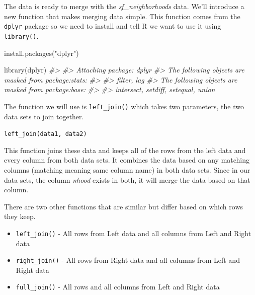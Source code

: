 \documentclass[
  12pt,
  openany]{book}
\newenvironment{Shaded}{\begin{snugshade}}{\end{snugshade}}
\newcommand{\CommentTok}[1]{\textcolor[rgb]{0.37,0.37,0.37}{\textit{#1}}}
\newcommand{\FunctionTok}[1]{\textcolor[rgb]{0,0,0}{#1}}
\newcommand{\NormalTok}[1]{#1}
\newcommand{\StringTok}[1]{\textcolor[rgb]{0.5,0.5,0.5}{#1}}
\providecommand{\tightlist}{%
  \setlength{\itemsep}{0pt}\setlength{\parskip}{0pt}}
\begin{document}
The data is ready to merge with the \emph{sf\_neighborhoods} data. We'll introduce a new function that makes merging data simple. This function comes from the \texttt{dplyr} package so we need to install and tell R we want to use it using \texttt{library()}.

\begin{Shaded}
\begin{Highlighting}[]
\FunctionTok{install.packages}\NormalTok{(}\StringTok{"dplyr"}\NormalTok{)}
\end{Highlighting}
\end{Shaded}

\begin{Shaded}
\begin{Highlighting}[]
\FunctionTok{library}\NormalTok{(dplyr)}
\CommentTok{\#\textgreater{} }
\CommentTok{\#\textgreater{} Attaching package: \textquotesingle{}dplyr\textquotesingle{}}
\CommentTok{\#\textgreater{} The following objects are masked from \textquotesingle{}package:stats\textquotesingle{}:}
\CommentTok{\#\textgreater{} }
\CommentTok{\#\textgreater{}     filter, lag}
\CommentTok{\#\textgreater{} The following objects are masked from \textquotesingle{}package:base\textquotesingle{}:}
\CommentTok{\#\textgreater{} }
\CommentTok{\#\textgreater{}     intersect, setdiff, setequal, union}
\end{Highlighting}
\end{Shaded}

The function we will use is \texttt{left\_join()} which takes two parameters, the two data sets to join together.

\texttt{left\_join(data1,\ data2)}

This function joins these data and keeps all of the rows from the left data and every column from both data sets. It combines the data based on any matching columns (matching meaning same column name) in both data sets. Since in our data sets, the column \emph{nhood} exists in both, it will merge the data based on that column.

There are two other functions that are similar but differ based on which rows they keep.

\begin{itemize}
\tightlist
\item
  \texttt{left\_join()} - All rows from Left data and all columns from Left and Right data
\item
  \texttt{right\_join()} - All rows from Right data and all columns from Left and Right data
\item
  \texttt{full\_join()} - All rows and all columns from Left and Right data
\end{itemize}
\end{document}
